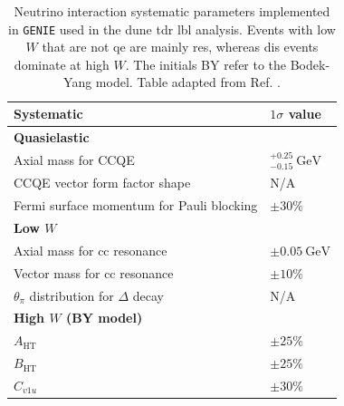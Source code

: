 \begin{table}[p!]
	\caption[Neutrino interaction systematic parameters implemented in \texttt{GENIE} used in the \gls{dune} \gls{tdr} \gls{lbl} analysis.]{Neutrino interaction systematic parameters implemented in \texttt{GENIE} used in the \gls{dune} \gls{tdr} \gls{lbl} analysis. Events with low $W$ that are not \gls{qe} are mainly \gls{res}, whereas \gls{dis} events dominate at high $W$. The initials BY refer to the Bodek-Yang model. Table adapted from Ref. \cite{DUNE2021}.}
	\begin{center}
		\begin{small}
			\begin{tabular}{l|l}
                Systematic                                     & $1\sigma$ value                 \\[2mm] \hline
                \rule{0pt}{1.1\normalbaselineskip}\textbf{Quasielastic}                          &                                 \\[2mm]
                Axial mass for CCQE                            & $^{+0.25}_{-0.15}~\mathrm{GeV}$ \\[2mm]
                CCQE vector form factor shape                  & N/A                             \\[2mm]
                Fermi surface momentum for Pauli blocking      & $\pm 30\%$                      \\[2mm] \hline
                \rule{0pt}{1.1\normalbaselineskip}\textbf{Low $W$}                               &                                 \\[2mm]
                Axial mass for \gls{cc} resonance                    & $\pm 0.05 ~ \mathrm{GeV}$       \\[2mm]
                Vector mass for \gls{cc} resonance                   & $\pm 10\%$                      \\[2mm]
                $\theta_{\pi}$ distribution for $\Delta$ decay & N/A                             \\[2mm] \hline
                \rule{0pt}{1.1\normalbaselineskip}\textbf{High $W$ (BY model)}                   &                                 \\[2mm]
                $A_{\mathrm{HT}}$                              & $\pm 25\%$                      \\[2mm]
                $B_{\mathrm{HT}}$                              & $\pm 25\%$                      \\[2mm]
                $C_{v1u}$                                      & $\pm 30\%$                      \\[2mm]

\end{tabular}
\end{small}
\end{center}
\end{table}
